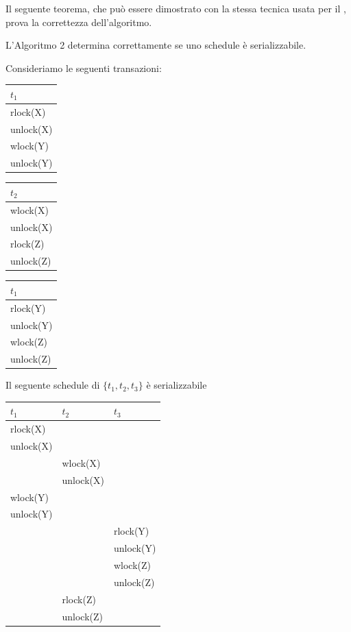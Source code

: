 Il seguente teorema, che può essere dimostrato con la stessa tecnica usata per il ,
prova la correttezza dell'algoritmo.
\begin{theo}
L'Algoritmo 2 determina correttamente se uno schedule è serializzabile. 
\end{theo}

Consideriamo le seguenti transazioni:
\begin{multicols}{3}
 \begin{tabular}{|l|}
  \hline
  $t_1$\\
  \hline
  rlock(X)\\
  unlock(X)\\
  wlock(Y)\\
  unlock(Y)\\
  \hline
 \end{tabular}
 
  \begin{tabular}{|l|}
  \hline
  $t_2$\\
  \hline
  wlock(X)\\
  unlock(X)\\
  rlock(Z)\\
  unlock(Z)\\
  \hline
 \end{tabular}
 
  \begin{tabular}{|l|}
  \hline
  $t_1$\\
  \hline
  rlock(Y)\\
  unlock(Y)\\
  wlock(Z)\\
  unlock(Z)\\
  \hline
 \end{tabular}
\end{multicols}

Il seguente schedule di $\{t_1, t_2, t_3\}$ è serializzabile
\begin{center}
\begin{tabular}{|l|l|l|}
 \hline
 $t_1$ & $t_2$ & $t_3$\\
 \hline
 rlock(X)& &\\
 unlock(X)& &\\
 & wlock(X)& \\
 & unlock(X)& \\
 wlock(Y)& & \\
 unlock(Y)& &\\
 & & rlock(Y)\\
 & & unlock(Y)\\
 & &wlock(Z)\\
 & &unlock(Z)\\
 & rlock(Z)& \\
 & unlock(Z)& \\
\hline
 \end{tabular}
\end{center}

